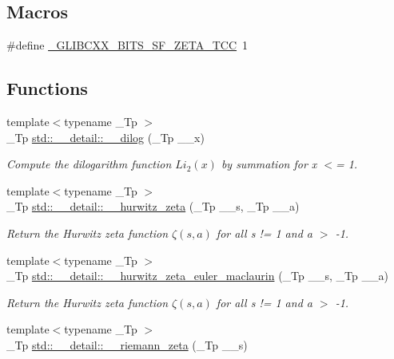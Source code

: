 \subsection*{Macros}
\begin{DoxyCompactItemize}
\item 
\#define \hyperlink{sf__zeta_8tcc_a23ad81fae0dc2d916125d596553c5dfc}{\+\_\+\+G\+L\+I\+B\+C\+X\+X\+\_\+\+B\+I\+T\+S\+\_\+\+S\+F\+\_\+\+Z\+E\+T\+A\+\_\+\+T\+CC}~1
\end{DoxyCompactItemize}
\subsection*{Functions}
\begin{DoxyCompactItemize}
\item 
{\footnotesize template$<$typename \+\_\+\+Tp $>$ }\\\+\_\+\+Tp \hyperlink{namespacestd_1_1____detail_a5083a0c9fce3299593ca22e7dbaeaf19}{std\+::\+\_\+\+\_\+detail\+::\+\_\+\+\_\+dilog} (\+\_\+\+Tp \+\_\+\+\_\+x)
\begin{DoxyCompactList}\small\item\em Compute the dilogarithm function $ Li_2(x) $ by summation for x $<$= 1. \end{DoxyCompactList}\item 
{\footnotesize template$<$typename \+\_\+\+Tp $>$ }\\\+\_\+\+Tp \hyperlink{namespacestd_1_1____detail_a63aafed798ada71b2cc58e84a6652169}{std\+::\+\_\+\+\_\+detail\+::\+\_\+\+\_\+hurwitz\+\_\+zeta} (\+\_\+\+Tp \+\_\+\+\_\+s, \+\_\+\+Tp \+\_\+\+\_\+a)
\begin{DoxyCompactList}\small\item\em Return the Hurwitz zeta function $ \zeta(s,a) $ for all s != 1 and a $>$ -\/1. \end{DoxyCompactList}\item 
{\footnotesize template$<$typename \+\_\+\+Tp $>$ }\\\+\_\+\+Tp \hyperlink{namespacestd_1_1____detail_a56c55858723fe9e0c541f0e77572b58d}{std\+::\+\_\+\+\_\+detail\+::\+\_\+\+\_\+hurwitz\+\_\+zeta\+\_\+euler\+\_\+maclaurin} (\+\_\+\+Tp \+\_\+\+\_\+s, \+\_\+\+Tp \+\_\+\+\_\+a)
\begin{DoxyCompactList}\small\item\em Return the Hurwitz zeta function $ \zeta(s,a) $ for all s != 1 and a $>$ -\/1. \end{DoxyCompactList}\item 
{\footnotesize template$<$typename \+\_\+\+Tp $>$ }\\\+\_\+\+Tp \hyperlink{namespacestd_1_1____detail_a2be77d9bdd1b8b463be44a0e7558bc2a}{std\+::\+\_\+\+\_\+detail\+::\+\_\+\+\_\+riemann\+\_\+zeta} (\+\_\+\+Tp \+\_\+\+\_\+s)

\end{DoxyCompactItemize}
